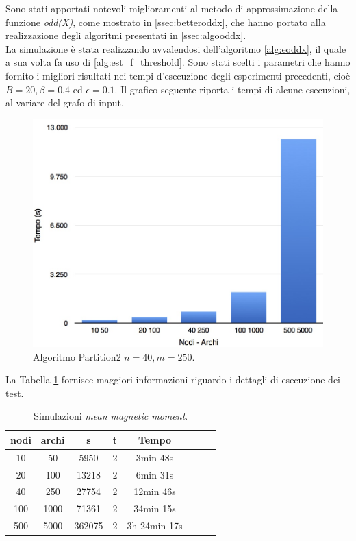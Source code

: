 Sono stati apportati notevoli miglioramenti al metodo di approssimazione della funzione \textit{odd(X)}, come mostrato in \ref{ssec:betteroddx}, che hanno portato alla realizzazione degli algoritmi presentati in \ref{ssec:algooddx}.\\
La simulazione è stata realizzando avvalendosi dell'algoritmo \ref{alg:eoddx}, il quale a sua volta fa uso di \ref{alg:est_f_threshold}. Sono stati scelti i parametri che hanno fornito i migliori risultati nei tempi d'esecuzione degli esperimenti precedenti, cioè $B = 20, \beta = 0.4$ ed $\epsilon = 0.1$.
Il grafico seguente riporta i tempi di alcune esecuzioni, al variare del grafo di input.
\begin{figure}[h!]
	\vspace*{1cm}
	\centering
	\includegraphics[scale=.3]{img/mmm.jpg}
	\caption{Algoritmo Partition2 $n = 40, m = 250$.}
\end{figure}
La Tabella \ref{tab:mmm} fornisce maggiori informazioni riguardo i dettagli di esecuzione dei test.
\begin{table}[]
	\centering
	\begin{tabular}{|c|c|c|c|c|c|c|c|}
		\hline
		nodi & archi & s & t & Tempo\\ \hline
		10& 50& 5950& 2& 3min 48s\\ \hline
		20& 100& 13218& 2& 6min 31s\\ \hline
		40& 250& 27754& 2& 12min 46s\\ \hline
		100& 1000& 71361& 2& 34min 15s\\ \hline
		500& 5000& 362075& 2& 3h 24min 17s\\ \hline
	\end{tabular}
	\caption{Simulazioni \textit{mean magnetic moment}.}\label{tab:mmm}
\end{table}
